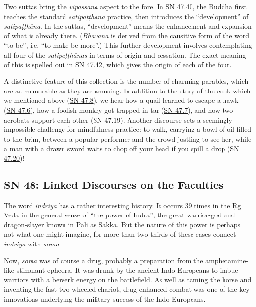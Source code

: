 \documentclass[12pt,openany]{book}%
\begin{document}
Two suttas bring the \textit{\textsanskrit{vipassanā}} aspect to the fore. In \href{https://suttacentral.net/sn47.40}{SN 47.40}, the Buddha first teaches the standard \textit{\textsanskrit{satipaṭṭhāna}} practice, then introduces the “development” of \textit{\textsanskrit{satipaṭṭhāna}}. In the suttas, “development” means the enhancement and expansion of what is already there. (\textit{\textsanskrit{Bhāvanā}} is derived from the causitive form of the word “to be”, i.e. “to make be more”.) This further development involves contemplating all four of the \textit{\textsanskrit{satipaṭṭhānas}} in terms of origin and cessation. The exact meaning of this is spelled out in \href{https://suttacentral.net/sn47.42}{SN 47.42}, which gives the origin of each of the four.

A distinctive feature of this collection is the number of charming parables, which are as memorable as they are amusing. In addition to the story of the cook which we mentioned above (\href{https://suttacentral.net/sn47.8}{SN 47.8}), we hear how a quail learned to escape a hawk (\href{https://suttacentral.net/sn47.6}{SN 47.6}), how a foolish monkey got trapped in tar (\href{https://suttacentral.net/sn47.7}{SN 47.7}), and how two acrobats support each other (\href{https://suttacentral.net/sn47.19}{SN 47.19}). Another discourse sets a seemingly impossible challenge for mindfulness practice: to walk, carrying a bowl of oil filled to the brim, between a popular performer and the crowd jostling to see her, while a man with a drawn sword waits to chop off your head if you spill a drop (\href{https://suttacentral.net/sn47.20}{SN 47.20})!

\subsection*{SN 48: Linked Discourses on the Faculties}

The word \textit{indriya} has a rather interesting history. It occurs 39 times in the Ṛg Veda in the general sense of “the power of Indra”, the great warrior-god and dragon-slayer known in Pali as Sakka. But the nature of this power is perhaps not what one might imagine, for more than two-thirds of these cases connect \textit{indriya} with \textit{soma}.

Now, \textit{soma} was of course a drug, probably a preparation from the amphetamine-like stimulant ephedra. It was drunk by the ancient Indo-Europeans to imbue warriors with a berserk energy on the battlefield. As well as taming the horse and inventing the fast two-wheeled chariot, drug-enhanced combat was one of the key innovations underlying the military success of the Indo-Europeans.
\end{document}
